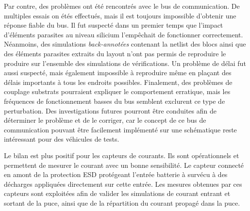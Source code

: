 Par contre, des problèmes ont été rencontrés avec le bus de communication.
De multiples essais on étés effectués, mais il est toujours impossible d'obtenir une réponse fiable du bus.
Il fut suspecté dans un premier temps que l'impact d'éléments parasites au niveau silicium l'empêchait de fonctionner correctement.
Néanmoins, des simulations \textit{back-annotées} contenant la netlist des blocs ainsi que des éléments parasites extraits du layout n'ont pas permis de reproduire le produire sur l'ensemble des simulations de vérifications.
Un problème de délai fut aussi suspecté, mais également impossible à reproduire même en plaçant des délais importants à tous les endroits possibles.
Finalement, des problèmes de couplage substrats pourraient expliquer le comportement erratique, mais les fréquences de fonctionnement basses du bus semblent exclurent ce type de perturbation.
Des investigations futures pourront être conduites afin de déterminer le problème et de le corriger, car le concept de ce bus de communication pouvant être facilement implémenté sur une schématique reste intéressant pour des véhicules de tests.

Le bilan est plus positif pour les capteurs de courants.
Ils sont opérationnels et permettent de mesurer le courant avec un bonne sensibilité.
Le capteur connecté en amont de la protection ESD protégeant l'entrée batterie à survécu à des décharges appliquées directement sur cette entrée.
Les mesures obtenues par ces capteurs sont exploitées afin de valider les simulations de courant entrant et sortant de la puce, ainsi que de la répartition du courant propagé dans la puce.
